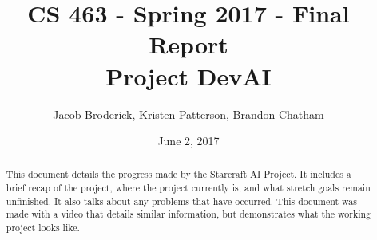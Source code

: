 \documentclass[10pt,letterpaper,onecolumn,draftclsnofoot]{IEEEtran}
\begin{document}
	
	\begin{titlepage}
		
		\title{CS 463 - Spring 2017 - Final Report \\ Project DevAI}
		\author{Jacob Broderick, Kristen Patterson, Brandon Chatham}
		\date{June 2, 2017}
		\maketitle
		\vspace{4cm}
		\begin{abstract}
			This document details the progress made by the Starcraft AI Project. It includes a brief recap of the project, where the project currently is, and what stretch goals remain unfinished. It also talks about any problems that have occurred. This document was made with a video that details similar information, but demonstrates what the working project looks like.
		\end{abstract}
	\end{titlepage}

\tableofcontents
\newpage
\end{document}
